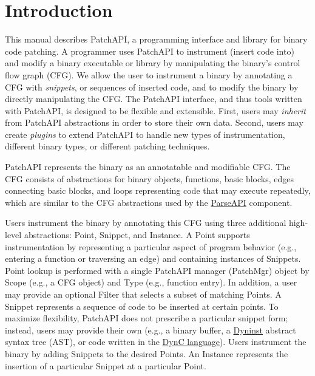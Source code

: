 \section{Introduction}
\label{sec:intro}

This manual describes PatchAPI, a programming interface and library
for binary code patching. A programmer uses PatchAPI to instrument
(insert code into) and modify a binary executable or library by
manipulating the binary's control flow graph (CFG). We allow the user
to instrument a binary by annotating a CFG with \emph{snippets}, or
sequences of inserted code, and to modify the binary by directly
manipulating the CFG. The PatchAPI interface, and thus tools written
with PatchAPI, is designed to be flexible and extensible. First, users
may \emph{inherit} from PatchAPI abstractions in order to store their
own data. Second, users may create \emph{plugins} to extend PatchAPI
to handle new types of instrumentation, different binary types, or
different patching techniques.

PatchAPI represents the binary as an annotatable and modifiable CFG. The CFG
consists of abstractions for binary objects, functions, basic blocks, edges
connecting basic blocks, and loops representing code that may execute repeatedly,
which are similar to the CFG abstractions used by the
\href{ftp://ftp.cs.wisc.edu/paradyn/releases/release7.0/doc/parseapi.pdf}{ParseAPI}
component.

Users instrument the binary by annotating this CFG using three additional
high-level abstractions: Point, Snippet, and Instance.  A Point supports
instrumentation by representing a particular aspect of program behavior (e.g.,
entering a function or traversing an edge) and containing instances of Snippets.
Point lookup is performed with a single PatchAPI manager (PatchMgr) object by
Scope (e.g., a CFG object) and Type (e.g., function entry). In addition, a user
may provide an optional Filter that selects a subset of matching Points.  A
Snippet represents a sequence of code to be inserted at certain points. To
maximize flexibility, PatchAPI does not prescribe a particular snippet form;
instead, users may provide their own (e.g., a binary buffer, a
\href{ftp://ftp.cs.wisc.edu/paradyn/releases/release7.0/doc/dyninstProgGuide.pdf}{Dyninst}
abstract syntax tree (AST), or code written in the
\href{ftp://ftp.cs.wisc.edu/paradyn/releases/release7.0/doc/dynC_API.pdf}{DynC
  language}). Users instrument the binary by adding Snippets to the desired
Points. An Instance represents the insertion of a particular Snippet at a
particular Point.


